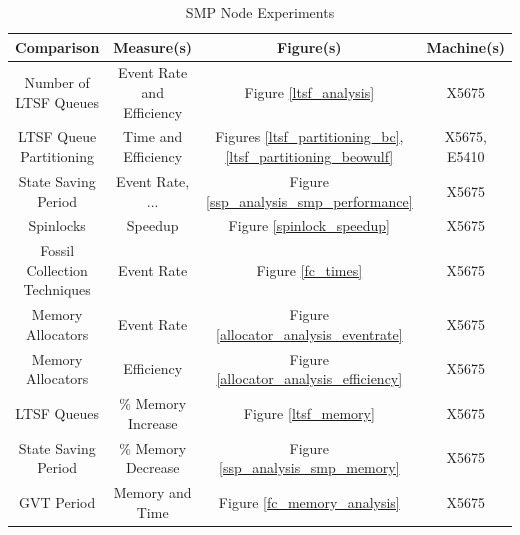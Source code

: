 \documentclass[11pt]{book}
\begin{document}
\begin{table}[H]
    \centering
    \begin{tabular}{| c | c | c | c |}
        \hline
        \textbf{Comparison} & \textbf{Measure(s)}  & \textbf{Figure(s)}   & \textbf{Machine(s)}  \\
        \hline
        Number of LTSF Queues & Event Rate and Efficiency   & Figure \ref{ltsf_analysis}    & X5675             \\
        \hline
        LTSF Queue Partitioning & Time and Efficiency    & Figures \ref{ltsf_partitioning_bc},
            \ref{ltsf_partitioning_beowulf}    & X5675, E5410 \\
        \hline
        State Saving Period & Event Rate, ...  & Figure \ref{ssp_analysis_smp_performance} & X5675 \\
        \hline
        Spinlocks & Speedup  & Figure \ref{spinlock_speedup} & X5675 \\
        \hline
        Fossil Collection Techniques & Event Rate    & Figure \ref{fc_times} & X5675 \\
        \hline
        Memory Allocators & Event Rate   & Figure \ref{allocator_analysis_eventrate} & X5675 \\
        \hline
        Memory Allocators & Efficiency   & Figure \ref{allocator_analysis_efficiency}    & X5675 \\
        \hline
        LTSF Queues & \% Memory Increase & Figure \ref{ltsf_memory}  & X5675 \\
        \hline
        State Saving Period & \% Memory Decrease & Figure \ref{ssp_analysis_smp_memory}  & X5675 \\
        \hline
        GVT Period & Memory and Time & Figure \ref{fc_memory_analysis}   & X5675 \\
        \hline
    \end{tabular}
    \caption{SMP Node Experiments}\label{smp_experiments}
\end{table}
\end{document}
